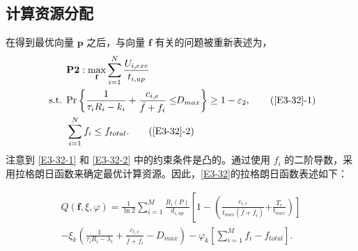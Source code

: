 \subsection{计算资源分配}\label{section3-3-4}
在得到最优向量 $\mathbf{p}$ 之后，与向量 $\mathbf{f}$ 有关的问题被重新表述为，
\begin{align}
& \textbf{P2}:\max\limits_{\mathbf{f}}\sum_{i=1}^{N}\frac{U_{i,exe}}{t_{i,up}}                                      \label{E3-32}\\
\text { s.t. }
& \textrm{Pr}\left\{\frac{1}{\tau_iR_i-k_i}+\frac{c_{i,e}}{\bar{f}+f_i}\le \!\!D_{max}\right\}\geq1-\varepsilon_2,  \tag{\ref{E3-32}{-1}}      \label{E3-32-1}\\  %
& \sum_{i=1}^{N}f_i\le f_{total}.                                                                                   \tag{\ref{E3-32}{-2}}      \label{E3-32-2}  %
\end{align}
注意到 \eqref{E3-32-1} 和 \eqref{E3-32-2} 中的约束条件是凸的。通过使用 $f_i$ 的二阶导数，采用拉格朗日函数来确定最优计算资源。因此，\eqref{E3-32}的拉格朗日函数表述如下：

\begin{equation}\label{E33}
\begin{aligned}
Q\left(\mathbf{f},\xi,\varphi\right)=\frac{1}{\ln{2}}\sum_{i=1}^{M}\frac{R_i\left(P\right)}{ d_{i,up}}
\left[1-
\left(\frac{c_{i,e}}{t_{max}\left(\bar{f}+f_i\right)}
\right.\right.
\left.\left.
+\frac{T_c}{t_{max}}
\right)
\right]\\
-\xi_k\left(\frac{1}{\tau_iR_i-\lambda_i}+\frac{c_{i,e}}{\bar{f}+f_i}-D_{max}\right)
-\varphi_k\left[\sum_{i=1}^{M}f_i-f_{total}\right].
\end{aligned}
\end{equation}

